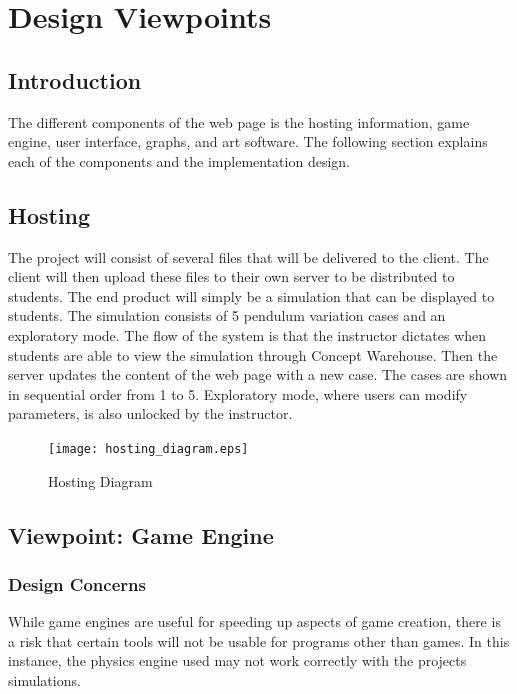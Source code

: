 \documentclass[onecolumn, draftclsnofoot,10pt, compsoc]{IEEEtran}
\begin{document}


\section{Design Viewpoints}

\subsection{Introduction}
The different components of the web page is the hosting information, game engine, user interface, graphs, and art software. The following section explains each of the components and the implementation design. 
\subsection{Hosting}
The project will consist of several files that will be delivered to the client. The client will then upload these files to their own server to be distributed to students. The end product will simply be a simulation that can be displayed to students.
The simulation consists of 5 pendulum variation cases and an exploratory mode. The flow of the system is that the instructor dictates when students are able to view the simulation through Concept Warehouse. Then the server updates the content of the web page with a new case. The cases are shown in sequential order from 1 to 5. Exploratory mode, where users can modify parameters, is also unlocked by the instructor. 

\begin{figure}[H]
  \texttt{[image: hosting\_diagram.eps]}
  \caption{Hosting Diagram}
  \label{fig:host}
\end{figure}

\subsection{Viewpoint: Game Engine}

\subsubsection{Design Concerns}
While game engines are useful for speeding up aspects of game creation, there is a risk that certain tools will not be usable for programs other than games. In this instance, the physics engine used may not work correctly with the projects simulations.
\end{document}

